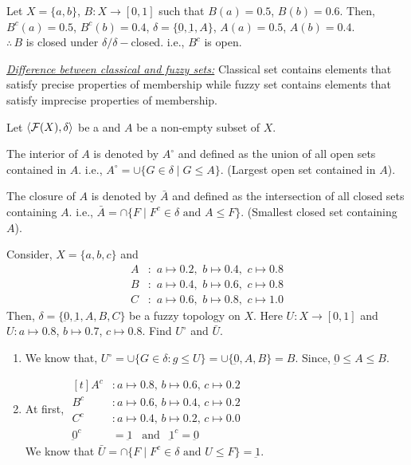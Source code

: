 \documentclass[../main-sheet.tex]{subfiles}
\begin{document}
\begin{ex}
    Let \(X=\{a,b \}\), \(B:X\to[0,1]\) such that \(B(a)=0.5\), \(B(b)=0.6\). Then, \(B^c(a)=0.5\), \(B^c(b)=0.4\), \(\delta=\{\underbar{0},\underbar{1},A\}\), \(A(a)=0.5\), \(A(b)=0.4\).\\
    \(\therefore\,B \) is closed under \(\delta/\delta-\)closed. i.e., \(B^c \) is open.
\end{ex}
\underline{\emph{Difference between classical and fuzzy sets:}} Classical set contains elements that satisfy precise properties of membership while fuzzy set contains elements that satisfy imprecise properties of membership.
\begin{defn}
    Let \(\langle \mathcal{F}(X), \delta \rangle\) be a \fts\s and \(A \) be a non-empty subset of \(X \).

    The interior of \(A \) is denoted by \(A^\circ\) and defined as the union of all open sets contained in \(A \). i.e., \(A^\circ=\cup \{G\in\delta\mid G\leq A \}\). (Largest open set contained in \(A \)).

    The closure of \(A \) is denoted by \(\bar{A }\) and defined as the intersection of all closed sets containing \(A \). i.e., \(\bar{A }=\cap\{F\mid F^c\in\delta\text{ and }A\leq F \}\). (Smallest closed set containing \(A \)).
\end{defn}
\begin{ex}
    Consider, \(X=\{a,b,c \}\) and 
    \begin{align*}
        A&:\,\,a\mapsto 0.2,\,\, b\mapsto 0.4,\,\, c\mapsto 0.8\\
        B&:\,\,a\mapsto 0.4,\,\, b\mapsto 0.6,\,\, c\mapsto 0.8\\
        C&:\,\,a\mapsto 0.6,\,\, b\mapsto 0.8,\,\, c\mapsto 1.0
    \end{align*}
    Then, \(\delta=\{\underbar{0},\underbar{1},A,B,C \}\) be a fuzzy topology on \(X \). Here \(U:X\to[0,1]\) and \(U:a\mapsto0.8\), \(b\mapsto0.7\), \(c\mapsto 0.8\). Find \(U^\circ\) and \(\bar{U}\).
\end{ex}
\begin{soln}
    \begin{enumerate}
        \item We know that, \(U^\circ=\cup\{G\in\delta:g\leq U\}=\cup\{\underbar{0},A,B \}=B \). Since, \(\underbar{0}\leq A\leq B \).
        \item At first, \(\begin{aligned}[t]
            A^c&: a\mapsto0.8,\,b\mapsto0.6,\,c\mapsto0.2\\
            B^c&: a\mapsto0.6,\,b\mapsto0.4,\,c\mapsto0.2\\
            C^c&: a\mapsto0.4,\,b\mapsto0.2,\,c\mapsto0.0\\
            \underbar{0}^c&= \underbar{1}\,\,\,\text{ and } \,\,\,\underbar{1}^c= \underbar{0}
        \end{aligned}\)\\
        We know that \(\bar{U}=\cap\{F\mid F^c\in\delta\text{ and }U\leq F\}=\underbar{1}\).
    \end{enumerate}
\end{soln}
\end{document}
